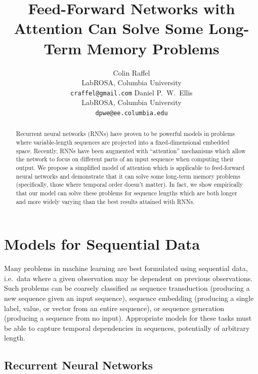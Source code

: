 \documentclass{article} %
\title{Feed-Forward Networks with Attention Can Solve Some Long-Term Memory Problems}
\author{
Colin Raffel\\
LabROSA, Columbia University\\
\texttt{craffel@gmail.com}
\And
Daniel P.~W.~Ellis\\
LabROSA, Columbia University\\
\texttt{dpwe@ee.columbia.edu}
}
\begin{document}
\maketitle

\begin{abstract}
Recurrent neural networks (RNNs) have proven to be powerful models in problems where variable-length sequences are projected into a fixed-dimensional embedded space.
Recently, RNNs have been augmented with ``attention'' mechanisms which allow the network to focus on different parts of an input sequence when computing their output.
We propose a simplified model of attention which is applicable to feed-forward neural networks and demonstrate that it can solve some long-term memory problems (specifically, those where temporal order doesn't matter).
In fact, we show empirically that our model can solve these problems for sequence lengths which are both longer and more widely varying than the best results attained with RNNs.
\end{abstract}

\section{Models for Sequential Data}

Many problems in machine learning are best formulated using sequential data, i.e.\ data where a given observation may be dependent on previous observations.
Such problems can be coarsely classified as sequence transduction (producing a new sequence given an input sequence), sequence embedding (producing a single label, value, or vector from an entire sequence), or sequence generation (producing a sequence from no input).
Appropriate models for these tasks must be able to capture temporal dependencies in sequences, potentially of arbitrary length.

\subsection{Recurrent Neural Networks}
\end{document}
